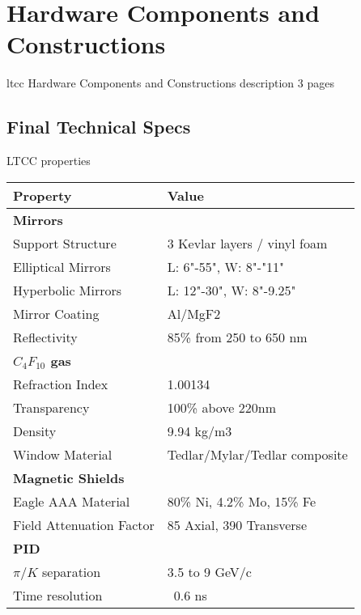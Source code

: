 \section{Hardware Components and Constructions}

ltcc Hardware Components and Constructions description 3 pages


\subsection{Final Technical Specs}


\begin{center}
	LTCC properties\\
	\begin{tabular}{| l | l |}
		\hline \hline
		Property                 & Value \\
		\hline
		{\bf Mirrors}            &                                      \\
		Support Structure        & 3 Kevlar layers / vinyl foam         \\
		Elliptical Mirrors       & L: 6"-55", W: 8"-"11"                \\
		Hyperbolic Mirrors       & L: 12"-30", W: 8"-9.25"              \\
		Mirror Coating           & Al/MgF2                              \\
		Reflectivity             & 85\% from 250 to 650 nm              \\
		{\bf $C_4F_{10}$ gas}    &                                      \\
		Refraction Index         & 1.00134                              \\
		Transparency             & 100\% above 220nm                    \\
		Density                  & 9.94 kg/m3                           \\
		Window Material          & Tedlar/Mylar/Tedlar composite        \\
		{\bf Magnetic Shields}   &                                      \\
		Eagle AAA Material       & 80\% Ni, 4.2\% Mo, 15\% Fe           \\
		Field Attenuation Factor &  85 Axial, 390 Transverse            \\
		{\bf PID}                &                                      \\
		$\pi/K$ separation       &  3.5 to 9 GeV/c                      \\
		Time resolution          &  ~0.6 ns                             \\
		\hline \hline
	\end{tabular}
\end{center}

